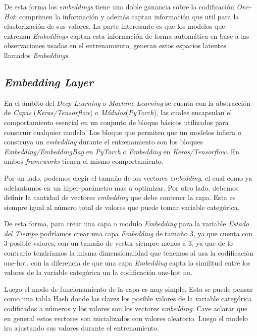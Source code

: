 \documentclass[11pt,a4paper,twoside]{thesis}
\begin{document}
De esta forma los \textit{embeddings} tiene una doble ganancia sobre la
codificación \textit{One-Hot}: comprimen la información y además captan
información que util para la clusterización de sus valores. La parte
interesante es que los modelos que entrenan \textit{Embeddings} captan esta
información de forma automática en base a las observaciones usadas en el
entrenamiento, generan estos espacios latentes llamados \textit{Embeddings}.

\subsection{\textit{Embedding Layer}}

En el ámbito del \textit{Deep Learning} o \textit{Machine Learning} se cuenta
con la abstracción de \textit{Capas} (\textit{Keras/Tensorflow}) o
\textit{Módulos}(\textit{PyTorch}), las cuales encapsulan el comportamiento
esencial en un conjunto de bloque básicos utilizados para construir cualquier
modelo. Los bloque que permiten que un modelos infiera o construya un
\textit{embedding} durante el entrenamiento son los bloques
\textit{Embedding/EmbeddingBag} en \textit{PyTorch} o \textit{Embedding} en
\textit{Keras/Tensorflow}. En ambos \textit{frameworks} tienen el mismo
comportamiento.

Por un lado, podemos elegir el tamaño de los vectores \textit{embedding}, el
cual como ya adelantamos en un hiper-parámetro mas a optimizar. Por otro lado,
debemos definir la cantidad de vectores \textit{embedding} que debe contener la
capa. Esta es siempre igual al número total de valores que puede tomar variable
categórica.

De esta forma, para crear una capa o modulo \textit{Embedding} para la variable
\textit{Estado del Tiempo} podríamos crear una capa \textit{Embedding} de
tamaño 3, ya que cuenta con 3 posible valores, con un tamaño de vector siempre
menos a 3, ya que de lo contrario tendríamos la misma dimensionalidad que
tenemos al usa la codificación one-hot, con la diferencia de que una capa
\textit{Embedding} capta la similitud entre los valores de la variable
categórica un la codificación one-hot no.

Luego el modo de funcionamiento de la capa es muy simple. Esta se puede pensar
como una tabla Hash donde las claves los posible valores de la variable
categórica codificados a números y los valores son los vectores
\textit{embedding}. Cave aclarar que en general estos vectores son
inicializados con valores aleatorio. Luego el modelo ira ajustando sus valores
durante el entrenamiento.
\end{document}
